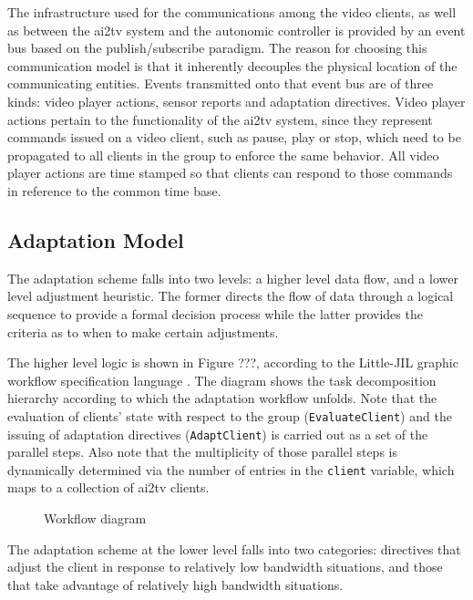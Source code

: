 \documentclass{sig-alternate}
\begin{document}
The infrastructure used for the communications among the video
clients, as well as between the ai2tv system and the autonomic
controller is provided by an event bus based on the publish/subscribe
paradigm.  The reason for choosing this communication model is that it
inherently decouples the physical location of the communicating
entities.  Events transmitted onto that event bus are of three kinds:
video player actions, sensor reports and adaptation directives.  Video
player actions pertain to the functionality of the ai2tv system, since
they represent commands issued on a video client, such as pause, play
or stop, which need to be propagated to all clients in the group to
enforce the same behavior.  All video player actions are time stamped
so that clients can respond to those commands in reference to the
common time base.

\subsection{Adaptation Model}

The adaptation scheme falls into two levels: a higher level data flow,
and a lower level adjustment heuristic.  The former directs the flow
of data through a logical sequence to provide a formal decision
process while the latter provides the criteria as to when to make
certain adjustments.

The higher level logic is shown in Figure ???, according to the
Little-JIL graphic workflow specification language \cite{LJIL}.  The
diagram shows the task decomposition hierarchy according to which the
adaptation workflow unfolds.  Note that the evaluation of clients'
state with respect to the group (\texttt{EvaluateClient}) and the
issuing of adaptation directives (\texttt{AdaptClient}) is carried out
as a set of the parallel steps.  Also note that the multiplicity of
those parallel steps is dynamically determined via the number of
entries in the \texttt{client} variable, which maps to a collection of
ai2tv clients.

%
%

\begin{figure} 
  \centering
  \hspace*{-5mm}
  \caption{Workflow diagram }
  \label{ljil}
\end{figure}

The adaptation scheme at the lower level falls into two categories:
directives that adjust the client in response to relatively low
bandwidth situations, and those that take advantage of relatively high
bandwidth situations.
\end{document}
